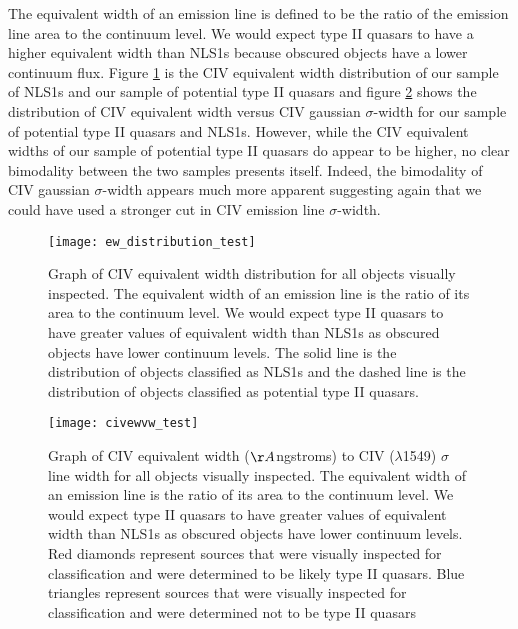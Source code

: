 \documentclass[preprint]{aastex}
\begin{document}
The equivalent width of an emission line is defined to be the ratio of the emission line area to the continuum level.  We would expect type II quasars to have a higher equivalent width than NLS1s because obscured objects have a lower continuum flux.  Figure \ref{fig:ew_distribution} is the CIV equivalent width distribution of our sample of NLS1s and our sample of potential type II quasars and figure \ref{fig:civewvw} shows the distribution of CIV equivalent width versus CIV gaussian $\sigma$-width for our sample of potential type II quasars and NLS1s.  However, while the CIV equivalent widths of our sample of potential type II quasars do appear to be higher, no clear bimodality between the two samples presents itself.  Indeed, the bimodality of CIV gaussian $\sigma$-width appears much more apparent suggesting again that we could have used a stronger cut in CIV emission line $\sigma$-width. 

\begin{figure}
\begin{center}
\texttt{[image: ew\_distribution\_test]}
\end{center}
\caption{Graph of CIV equivalent width distribution for all objects visually inspected. The equivalent width of an emission line is the ratio of its area to the continuum level.  We would expect type II quasars to have greater values of equivalent width than NLS1s as obscured objects have lower continuum levels.  The solid line is the distribution of objects classified as NLS1s and the dashed line is the distribution of objects classified as potential type II quasars.}
\label{fig:ew_distribution}
\end{figure}

\begin{figure}
\begin{center}
\texttt{[image: civewvw\_test]}
\end{center}
\caption{Graph of CIV equivalent width ($\AA$ngstroms) to CIV ($\lambda$1549) $\sigma$ line width for all objects visually inspected. The equivalent width of an emission line is the ratio of its area to the continuum level.  We would expect type II quasars to have greater values of equivalent width than NLS1s as obscured objects have lower continuum levels.   Red diamonds represent sources that were visually inspected for classification and were determined to be likely type II quasars.  Blue triangles represent sources that were visually inspected for classification and were determined not to be type II quasars}
\label{fig:civewvw}
\end{figure}
\end{document}
